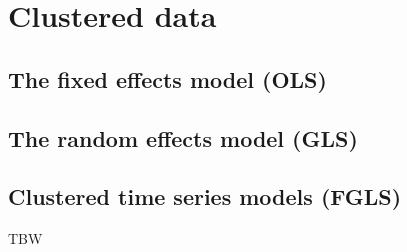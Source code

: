 \chapter{Clustered data}

\section{The fixed effects model (OLS)}

\section{The random effects model (GLS)}

\section{Clustered time series models (FGLS)}

TBW

